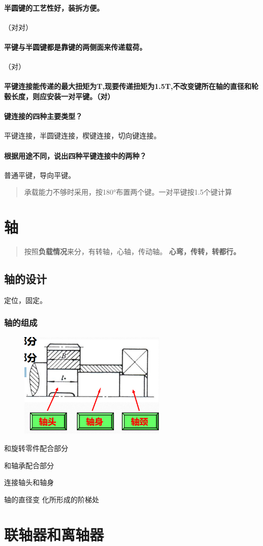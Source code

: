 \documentclass[twocolumn]{ctexart}
\begin{document}
\paragraph{半圆键的工艺性好，装拆方便。}（对对）
\paragraph{平键与半圆键都是靠键的两侧面来传递载荷。}（对）
\paragraph{平键连接能传递的最大扭矩为T,现要传递扭矩为1.5T,不改变键所在轴的直径和轮毂长度，则应安装一对平键。（对）}
\paragraph{键连接的四种主要类型？} 平键连接，半圆键连接，楔键连接，切向键连接。
\paragraph{根据用途不同，说出四种平键连接中的两种？}普通平键，导向平键。
\begin{quote}
{\qquad{}\ccwd\kaishu{}
承载能力不够时采用，按180°布置两个键。一对平键按1.5个键计算
}
\end{quote}
\section{轴}
\begin{quote}
{\qquad{}\ccwd\kaishu{}
按照\textbf{负载情况}来分，有转轴，心轴，传动轴。
\textbf{心弯，传转，转都行。}
}
\end{quote}
\subsection{轴的设计}
定位，固定。
\subsubsection{轴的组成}
        \begin{figure}[H]
            \centering
            \includegraphics[width=7cm]{img/19.png}
            \end{figure}
\begin{description}[leftmargin=1.7cm,style=nextline,nosep]%
  \item[轴头] 和旋转零件配合部分
  \item[轴身] 和轴承配合部分
  \item[轴颈] 连接轴头和轴身
  \item[轴肩]  轴的直径变
  化所形成的阶梯处
\end{description}
\section{联轴器和离轴器}
\end{document}
